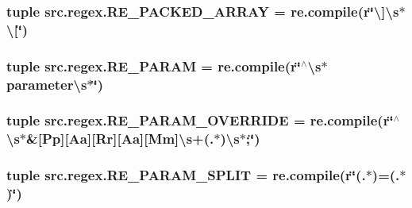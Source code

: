 \hypertarget{namespacesrc_1_1regex_a8ab431b189b258df06951b5b38371936}{
\subsubsection[{R\-E\-\_\-\-P\-A\-C\-K\-E\-D\-\_\-\-A\-R\-R\-A\-Y}]{\setlength{\rightskip}{0pt plus 5cm}tuple src.\-regex.\-R\-E\-\_\-\-P\-A\-C\-K\-E\-D\-\_\-\-A\-R\-R\-A\-Y = re.\-compile(r\char`\"{}\textbackslash{}\mbox{]}\textbackslash{}s$\ast$\textbackslash{}\mbox{[}\char`\"{})}}\label{namespacesrc_1_1regex_a8ab431b189b258df06951b5b38371936}
\hypertarget{namespacesrc_1_1regex_ac9116c703bbb8f7840b81c535f03218c}{
\subsubsection[{R\-E\-\_\-\-P\-A\-R\-A\-M}]{\setlength{\rightskip}{0pt plus 5cm}tuple src.\-regex.\-R\-E\-\_\-\-P\-A\-R\-A\-M = re.\-compile(r\char`\"{}$^\wedge$\textbackslash{}s$\ast$parameter\textbackslash{}s$\ast$\char`\"{})}}\label{namespacesrc_1_1regex_ac9116c703bbb8f7840b81c535f03218c}
\hypertarget{namespacesrc_1_1regex_a90c41c49bca5bb74167fba0c22d719e6}{
\subsubsection[{R\-E\-\_\-\-P\-A\-R\-A\-M\-\_\-\-O\-V\-E\-R\-R\-I\-D\-E}]{\setlength{\rightskip}{0pt plus 5cm}tuple src.\-regex.\-R\-E\-\_\-\-P\-A\-R\-A\-M\-\_\-\-O\-V\-E\-R\-R\-I\-D\-E = re.\-compile(r\char`\"{}$^\wedge$\textbackslash{}s$\ast$\&\mbox{[}Pp\mbox{]}\mbox{[}Aa\mbox{]}\mbox{[}Rr\mbox{]}\mbox{[}Aa\mbox{]}\mbox{[}Mm\mbox{]}\textbackslash{}s+(.$\ast$)\textbackslash{}s$\ast$;\char`\"{})}}\label{namespacesrc_1_1regex_a90c41c49bca5bb74167fba0c22d719e6}
\hypertarget{namespacesrc_1_1regex_a1be39b603c3992f11ede9a1591636f9d}{
\subsubsection[{R\-E\-\_\-\-P\-A\-R\-A\-M\-\_\-\-S\-P\-L\-I\-T}]{\setlength{\rightskip}{0pt plus 5cm}tuple src.\-regex.\-R\-E\-\_\-\-P\-A\-R\-A\-M\-\_\-\-S\-P\-L\-I\-T = re.\-compile(r\char`\"{}(.$\ast$)=(.$\ast$)\char`\"{})}}\label{namespacesrc_1_1regex_a1be39b603c3992f11ede9a1591636f9d}
